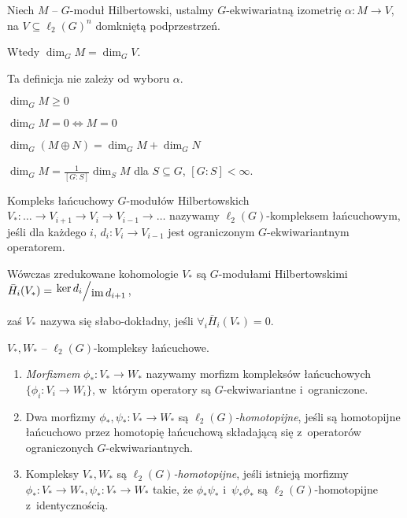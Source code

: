 \begin{definicja}
	Niech $M$ -- $G$-moduł Hilbertowski, ustalmy $G$-ekwiwariatną
	izometrię $\alpha: M \to V$, na $V \subseteq \ell_2(G)^n$
	domkniętą podprzestrzeń.
	
	Wtedy $\dim_G M = \dim_G V$.
\end{definicja}

\begin{uwaga}
	Ta definicja nie zależy od wyboru $\alpha$.
\end{uwaga}

\begin{wniosek}
	$\dim_G M \geq 0$
	
	$\dim_G M = 0 \iff M = 0$
\end{wniosek}

\begin{wniosek}
	$\dim_G(M \oplus N) = \dim_G M + \dim_G N$
\end{wniosek}

\begin{wniosek}
	$\dim_G M = \frac 1 {[G:S]} \dim_S M$ dla $S \subseteq G$,
	$[G:S] < \infty$.
\end{wniosek}

\begin{definicja}
	Kompleks łańcuchowy $G$-modułów Hilbertowskich
	${V_\ast: \ldots \to V_{i+1} \to V_i \to V_{i-1} \to \ldots}$
	nazywamy $\ell_2(G)$-kompleksem łańcuchowym, jeśli
	dla każdego $i$, $d_i:V_i \to V_{i-1}$ jest
	ograniczonym $G$-ekwiwariantnym operatorem.
	
	Wówczas zredukowane kohomologie $V_\ast$ są $G$-modułami 
	Hilbertowskimi $\bar{H}_i(V_\ast) 
	= \bigslant{\ker d_i}{\im d_{i+1}}$,
	
	zaś $V_\ast$ nazywa się słabo-dokładny, jeśli 
	$\forall_i \bar{H}_i(V_\ast) = 0$.
\end{definicja}

\begin{definicja}
	$V_\ast, W_\ast$ -- $\ell_2(G)$-kompleksy łańcuchowe.
	\begin{enumerate}
		\item \emph{Morfizmem} $\phi_\ast:V_\ast \to W_\ast$
		nazywamy morfizm kompleksów łańcuchowych
		${\{\phi_i : V_i \to W_i\}}$,
		w~którym operatory są $G$-ekwiwariantne i~ograniczone.
		
		\item Dwa morfizmy $\phi_\ast, \psi_\ast:V_\ast \to W_\ast$
		są \emph{$\ell_2(G)$-homotopijne}, jeśli są homotopijne
		łańcuchowo przez homotopię łańcuchową
		składającą się z~operatorów ograniczonych
		$G$-ekwiwariantnych.
		
		\item Kompleksy $V_\ast, W_\ast$ są 
		\emph{$\ell_2(G)$-homotopijne}, jeśli istnieją morfizmy
		${\phi_\ast:V_\ast \to W_\ast}, {\psi_\ast:V_\ast \to W_\ast}$
		takie, że $\phi_\ast \psi_\ast$ i~$\psi_\ast \phi_\ast$
		są $\ell_2(G)$-homotopijne z~identycznością.
	\end{enumerate}

\end{definicja}

